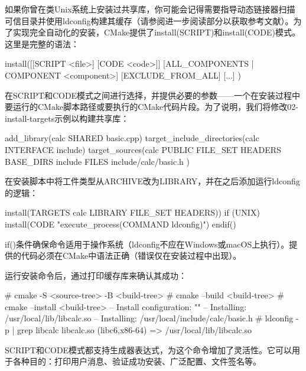 
如果你曾在类Unix系统上安装过共享库，你可能会记得需要指导动态链接器扫描可信目录并使用ldconfig构建其缓存（请参阅进一步阅读部分以获取参考文献）。为了实现完全自动化的安装，CMake提供了install(SCRIPT)和install(CODE)模式。这里是完整的语法：

\begin{shell}
install([[SCRIPT <file>] [CODE <code>]]
        [ALL_COMPONENTS | COMPONENT <component>]
        [EXCLUDE_FROM_ALL] [...]
)
\end{shell}

在SCRIPT和CODE模式之间进行选择，并提供必要的参数——一个在安装过程中要运行的CMake脚本路径或要执行的CMake代码片段。为了说明，我们将修改02-install-targets示例以构建共享库：


\begin{cmake}
add_library(calc SHARED basic.cpp)
target_include_directories(calc INTERFACE include)
target_sources(calc PUBLIC FILE_SET HEADERS
                           BASE_DIRS include
                           FILES include/calc/basic.h
)
\end{cmake}

在安装脚本中将工件类型从ARCHIVE改为LIBRARY，并在之后添加运行ldconfig的逻辑：


\begin{cmake}
install(TARGETS calc LIBRARY FILE_SET HEADERS))
if (UNIX)
    install(CODE "execute_process(COMMAND ldconfig)")
endif()
\end{cmake}

if()条件确保命令适用于操作系统（ldconfig不应在Windows或macOS上执行）。提供的代码必须在CMake中语法正确（错误仅在安装过程中出现）。

运行安装命令后，通过打印缓存库来确认其成功：

\begin{shell}
# cmake -S <source-tree> -B <build-tree>
# cmake --build <build-tree>
# cmake --install <build-tree>
-- Install configuration: ""
-- Installing: /usr/local/lib/libcalc.so
-- Installing: /usr/local/include/calc/basic.h
# ldconfig -p | grep libcalc
        libcalc.so (libc6,x86-64) => /usr/local/lib/libcalc.so
\end{shell}

SCRIPT和CODE模式都支持生成器表达式，为这个命令增加了灵活性。它可以用于各种目的：打印用户消息、验证成功安装、广泛配置、文件签名等。

